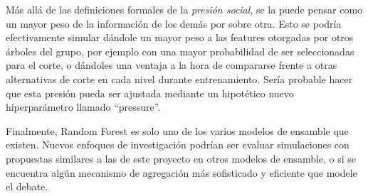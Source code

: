 Más allá de las definiciones formales de la \textit{presión social}, se la puede pensar como un mayor peso de la información de los demás por sobre otra. Esto se podría efectivamente simular dándole un mayor peso a las features otorgadas por otros árboles del grupo, por ejemplo con una mayor probabilidad de ser seleccionadas para el corte, o dándoles una ventaja a la hora de compararse frente a otras alternativas de corte en cada nivel durante entrenamiento. Sería probable hacer que esta presión pueda ser ajustada mediante un hipotético nuevo hiperparámetro llamado “pressure”.

Finalmente, Random Forest es solo uno de los varios modelos de ensamble que existen. Nuevos enfoques de investigación podrían ser evaluar simulaciones con propuestas similares a las de este proyecto en otros modelos de ensamble, o si se encuentra algún mecanismo de agregación más sofisticado y eficiente que modele el debate.
